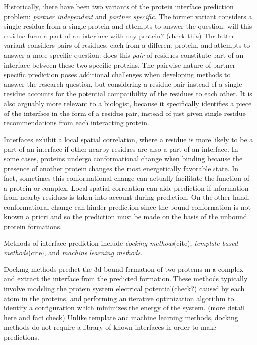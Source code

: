 Historically, there have been two variants of the protein interface prediction problem: \textit{partner independent} and \textit{partner specific}.
The former variant considers a single residue from a single protein and attempts to answer the question: will this residue form a part of an interface with any protein? (check this)
The latter variant considers pairs of residues, each from a different protein, and attempts to answer a more specific question: does this \textit{pair} of residues constitute part of an interface between these two specific proteins. 
The pairwise nature of partner specific prediction poses additional challenges when developing methods to answer the research question, but considering a residue pair instead of a single residue accounts for the potential compatibility of the residues to each other.
It is also arguably more relevant to a biologist, because it specifically identifies a piece of the interface in the form of a residue pair, instead of just given single residue recommendations from each interacting protein. 

Interfaces exhibit a local spatial correlation, where a residue is more likely to be a part of an interface if other nearby residues are also a part of an interface. 
In some cases, proteins undergo conformational change when binding because the presence of another protein changes the most energetically favorable state. 
In fact, sometimes this conformational change can actually facilitate the function of a protein or complex.
Local spatial correlation can aide prediction if information from nearby residues is taken into account during prediction.
On the other hand, conformational change can hinder prediction since the bound conformation is not known a priori and so the prediction must be made on the basis of the unbound protein formations. 

Methods of interface prediction include \textit{docking methods}(cite), \textit{template-based methods}(cite), and \textit{machine learning methods}.

Docking methods predict the 3d bound formation of two proteins in a complex and extract the interface from the predicted formation. 
These methods typically involve modeling the protein system electrical potential(check?) caused by each atom in the proteins, and performing an iterative optimization algorithm to identify a configuration which minimizes the energy of the system. (more detail here and fact check)
Unlike template and machine learning methods, docking methods do not require a library of known interfaces in order to make predictions.

